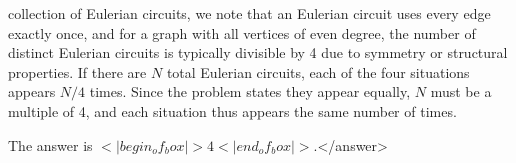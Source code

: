 collection of Eulerian circuits, we note that an Eulerian circuit uses every edge exactly once, and for a graph with all vertices of even degree, the number of distinct Eulerian circuits is typically divisible by 4 due to symmetry or structural properties. If there are \( N \) total Eulerian circuits, each of the four situations appears \( N/4 \) times. Since the problem states they appear equally, \( N \) must be a multiple of 4, and each situation thus appears the same number of times.  

The answer is \(<|begin_of_box|>4<|end_of_box|>\).</answer>